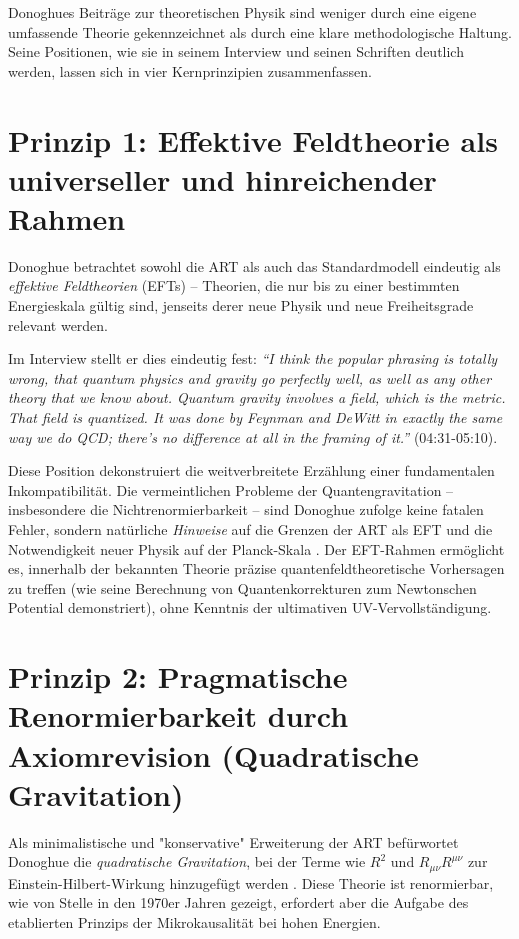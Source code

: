 	
	Donoghues Beiträge zur theoretischen Physik sind weniger durch eine eigene umfassende Theorie gekennzeichnet als durch eine klare methodologische Haltung. Seine Positionen, wie sie in seinem Interview \cite{DonoghueInterview2025} und seinen Schriften \cite{Donoghue1995, Donoghue2022} deutlich werden, lassen sich in vier Kernprinzipien zusammenfassen.
	
	\section{Prinzip 1: Effektive Feldtheorie als universeller und hinreichender Rahmen}
	
	Donoghue betrachtet sowohl die ART als auch das Standardmodell eindeutig als \emph{effektive Feldtheorien} (EFTs) – Theorien, die nur bis zu einer bestimmten Energieskala gültig sind, jenseits derer neue Physik und neue Freiheitsgrade relevant werden.
	
	Im Interview stellt er dies eindeutig fest: \emph{``I think the popular phrasing is totally wrong, that quantum physics and gravity go perfectly well, as well as any other theory that we know about. Quantum gravity involves a field, which is the metric. That field is quantized. It was done by Feynman and DeWitt in exactly the same way we do QCD; there's no difference at all in the framing of it.''} \cite{DonoghueInterview2025} (04:31-05:10).
	
	Diese Position dekonstruiert die weitverbreitete Erzählung einer fundamentalen Inkompatibilität. Die vermeintlichen Probleme der Quantengravitation – insbesondere die Nichtrenormierbarkeit – sind Donoghue zufolge keine fatalen Fehler, sondern natürliche \emph{Hinweise} auf die Grenzen der ART als EFT und die Notwendigkeit neuer Physik auf der Planck-Skala \cite{Donoghue1995}. Der EFT-Rahmen ermöglicht es, innerhalb der bekannten Theorie präzise quantenfeldtheoretische Vorhersagen zu treffen (wie seine Berechnung von Quantenkorrekturen zum Newtonschen Potential demonstriert), ohne Kenntnis der ultimativen UV-Vervollständigung.
	
	\section{Prinzip 2: Pragmatische Renormierbarkeit durch Axiomrevision (Quadratische Gravitation)}
	
	Als minimalistische und "konservative" Erweiterung der ART befürwortet Donoghue die \emph{quadratische Gravitation}, bei der Terme wie $R^2$ und $R_{\mu\nu}R^{\mu\nu}$ zur Einstein-Hilbert-Wirkung hinzugefügt werden \cite{Salvio2018}. Diese Theorie ist renormierbar, wie von Stelle in den 1970er Jahren gezeigt, erfordert aber die Aufgabe des etablierten Prinzips der Mikrokausalität bei hohen Energien.
	
